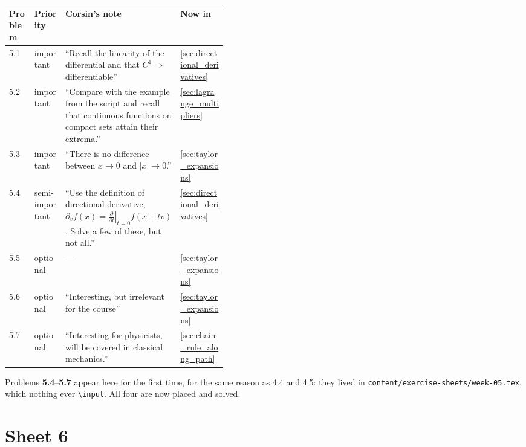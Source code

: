 \begin{center}
\begin{tabular}{@{}l l p{0.42\linewidth} l@{}}
\textbf{Problem} & \textbf{Priority} & \textbf{Corsin's note} & \textbf{Now in} \\
\hline
5.1 & important & ``Recall the linearity of the differential and that $C^1 \Rightarrow$
  differentiable'' & \cref{sec:directional_derivatives} \\[3pt]
5.2 & important & ``Compare with the example from the script and recall that continuous
  functions on compact sets attain their extrema.'' & \cref{sec:lagrange_multipliers} \\[3pt]
5.3 & important & ``There is no difference between $x \to 0$ and $|x| \to 0$.'' &
  \cref{sec:taylor_expansions} \\[3pt]
5.4 & semi-important & ``Use the definition of directional derivative,
  $\partial_v f(x) = \left.\frac{\partial}{\partial t}\right|_{t=0} f(x+tv)$. Solve a few of
  these, but not all.'' & \cref{sec:directional_derivatives} \\[3pt]
5.5 & optional & --- & \cref{sec:taylor_expansions} \\[3pt]
5.6 & optional & ``Interesting, but irrelevant for the course'' & \cref{sec:taylor_expansions} \\[3pt]
5.7 & optional & ``Interesting for physicists, will be covered in classical mechanics.'' &
  \cref{sec:chain_rule_along_path} \\
\end{tabular}
\end{center}

\begin{ainote}
Problems \textbf{5.4}--\textbf{5.7} appear here for the first time, for the same reason as 4.4
and 4.5: they lived in \texttt{content/exercise-sheets/week-05.tex}, which nothing ever
\texttt{\textbackslash input}. All four are now placed and solved.
\end{ainote}

\section{Sheet 6}
\label{sec:sheet_index_6}

